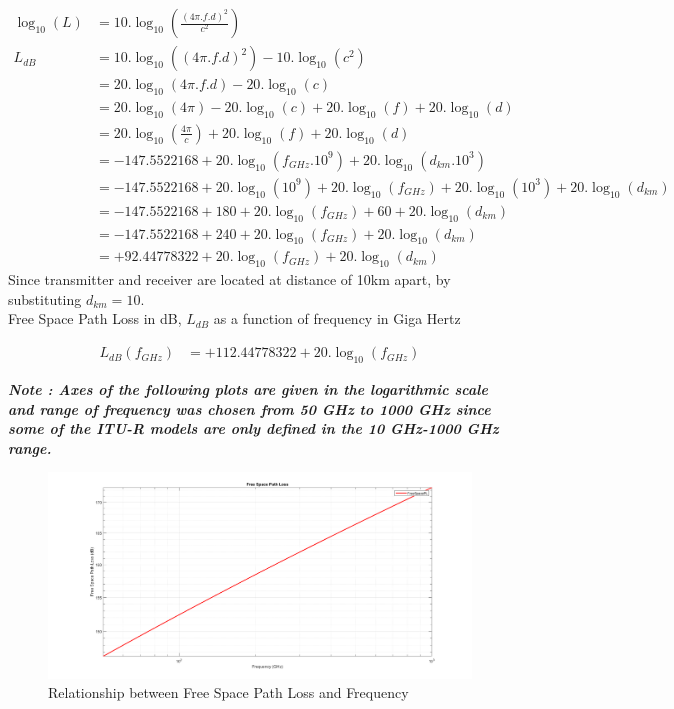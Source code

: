 \documentclass[a4paper,11pt]{article}%
\begin{document}
\[
\begin{split}
\log_{10}(L) &= 10.\log_{10}(\frac{(4\pi.f.d)^2}{c^2})\\
L_{dB}& = 10.\log_{10}((4\pi.f.d)^2) - 10.\log_{10}(c^2)\\
&=20.\log_{10}(4\pi.f.d)-20.\log_{10}(c)\\
&=20.\log_{10}(4\pi)-20.\log_{10}(c) + 20.\log_{10}(f) + 20.\log_{10}(d)\\
&=20.\log_{10}(\frac{4\pi}{c}) + 20.\log_{10}(f) + 20.\log_{10}(d)\\
&= -147.5522168 + 20.\log_{10}(f_{GHz}.10^9) + 20.\log_{10}(d_{km}.10^3)\\
& = -147.5522168 + 20.\log_{10}(10^9)+ 20.\log_{10}(f_{GHz}) + 20.\log_{10}(10^3) + 20.\log_{10}(d_{km})\\
&= -147.5522168 + 180+ 20.\log_{10}(f_{GHz}) + 60 + 20.\log_{10}(d_{km})\\
&= -147.5522168 + 240+ 20.\log_{10}(f_{GHz}) + 20.\log_{10}(d_{km})\\
&= +92.44778322+20.\log_{10}(f_{GHz}) + 20.\log_{10}(d_{km})
\end{split}
\]
Since transmitter and receiver are located at distance of 10km apart, by substituting $d_{km}= 10$.\\

Free Space Path Loss in dB, $L_{dB}$ as a function of frequency in Giga Hertz

\[
\begin{split}
L_{dB}(f_{GHz})&=  +112.44778322+20.\log_{10}(f_{GHz})
\end{split}
\]

\textbf{\textit{Note : Axes of the following plots are given in the logarithmic scale and range of frequency was chosen from 50 GHz to 1000 GHz since some of the ITU-R models are only defined in the 10 GHz-1000 GHz range.}}

\begin{figure}[!h]
	\centering
	\includegraphics[scale=0.35]{figures/FreeSpacePL.png}
	\caption{Relationship between Free Space Path Loss and Frequency}
\end{figure}
\end{document}
